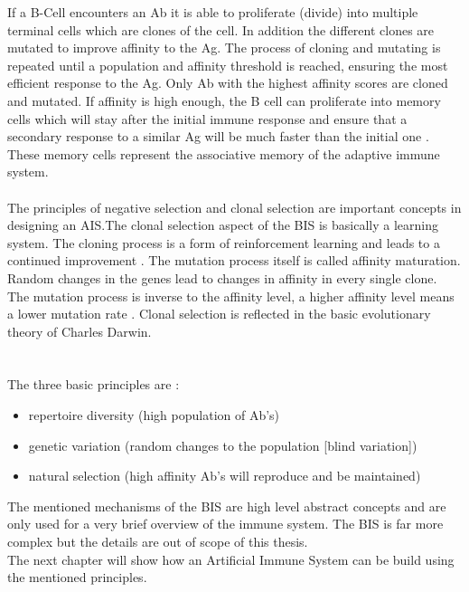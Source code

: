 If a B-Cell encounters an Ab it is able to proliferate (divide) into multiple terminal cells which are clones of the cell. In addition the different clones are mutated to improve affinity to the Ag. The process of cloning and mutating is repeated until a population and affinity threshold is reached, ensuring the most efficient response to the Ag. Only Ab with the highest affinity scores are cloned and mutated. If affinity is high enough, the B cell can proliferate into memory cells which will stay after the initial immune response and ensure that a secondary response to a similar Ag will be much faster than the initial one \cite{DEC02}. These memory cells represent the associative memory of the adaptive immune system. 
\\\\
 The principles of negative selection and clonal selection are important concepts in designing an AIS.The clonal selection aspect of the BIS is basically a learning system. The cloning process is a form of reinforcement learning and leads to a continued improvement \cite{DEC02}.
The mutation process itself is called affinity maturation. Random changes in the genes lead to changes in affinity in every single clone. The mutation process is inverse to the affinity level,  a higher affinity level means a lower mutation rate \cite{DEC02}.  
Clonal selection is reflected in the basic evolutionary theory of Charles Darwin.\\\\\\ The three basic principles are \cite{DEC02}:
\\
\begin{itemize}
	\item 	repertoire diversity (high population of Ab's)
	\item 	genetic variation (random changes to the population [blind variation])
	\item 	natural selection (high affinity Ab's will reproduce and be maintained) 
	
\end{itemize}

The mentioned mechanisms of the BIS are high level abstract concepts and are only used for a very brief overview of the immune system. The BIS is far more complex but the details are out of scope of this thesis.\\
The next chapter will show how an Artificial Immune System can be build using the mentioned principles.



